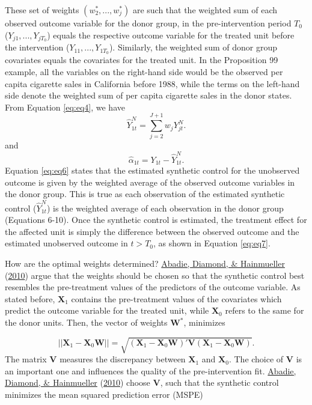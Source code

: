 \documentclass[12pt,nobind, a4paper]{reedthesis}
\begin{document}
 These set of weights \((w_{2}^{*},...,w_{j}^{*})\) are such that the weighted sum of each observed outcome variable for the donor group, in the pre-intervention period \(T_0\) (\(Y_{j1},..., Y_{jT_0}\)) equals the respective outcome variable for the treated unit before the intervention (\(Y_{11},...,Y_{1T_0}\)). Similarly, the weighted sum of donor group covariates equals the covariates for the treated unit. In the Proposition 99 example, all the variables on the right-hand side would be the observed per capita cigarette sales in California before 1988, while the terms on the left-hand side denote the weighted sum of per capita cigarette sales in the donor states. From Equation \eqref{eq:eq4}, we have
 \begin{equation}
 \hat{Y}^{N}_{1t}=\sum_{j=2}^{J+1}w_{j}Y^{N}_{jt}.
 \label{eq:eq6}
 \end{equation}
 and
 \begin{equation}
 \hat{\alpha}_{1t}={Y_{1t}}-\hat{Y}^{N}_{1t}.
 \label{eq:eq7}
 \end{equation}
 Equation \eqref{eq:eq6} states that the estimated synthetic control for the unobserved outcome is given by the weighted average of the observed outcome variables in the donor group. This is true as each observation of the estimated synthetic control (\(\hat{Y}^{N}_{1t}\)) is the weighted average of each observation in the donor group (Equations 6-10). Once the synthetic control is estimated, the treatment effect for the affected unit is simply the difference between the observed outcome and the estimated unobserved outcome in \(t>T_0\), as shown in Equation \eqref{eq:eq7}.
 \linebreak

 How are the optimal weights determined? \protect\hyperlink{ref-abadie_synthetic_2010}{Abadie, Diamond, \& Hainmueller} (\protect\hyperlink{ref-abadie_synthetic_2010}{2010}) argue that the weights should be chosen so that the synthetic control best resembles the pre-treatment values of the predictors of the outcome variable. As stated before, \(\mathbf{X}_1\) contains the pre-treatment values of the covariates which predict the outcome variable for the treated unit, while \(\mathbf{X}_0\) refers to the same for the donor units. Then, the vector of weights \(\mathbf{W^*}\), minimizes

 \[||\mathbf{X}_1-\mathbf{X}_{0}\mathbf{W}||=\sqrt{(\mathbf{X}_1-\mathbf{X}_{0} \mathbf{W})' \mathbf{V}(\mathbf{X}_1-\mathbf{X}_{0} \mathbf{W})}.\]
 The matrix \(\mathbf{V}\) measures the discrepancy between \(\mathbf{X}_1\) and \(\mathbf{X}_0\). The choice of \(\mathbf{V}\) is an important one and influences the quality of the pre-intervention fit. \protect\hyperlink{ref-abadie_synthetic_2010}{Abadie, Diamond, \& Hainmueller} (\protect\hyperlink{ref-abadie_synthetic_2010}{2010}) choose \(\mathbf{V}\), such that the synthetic control minimizes the mean squared prediction error (MSPE)
\end{document}

